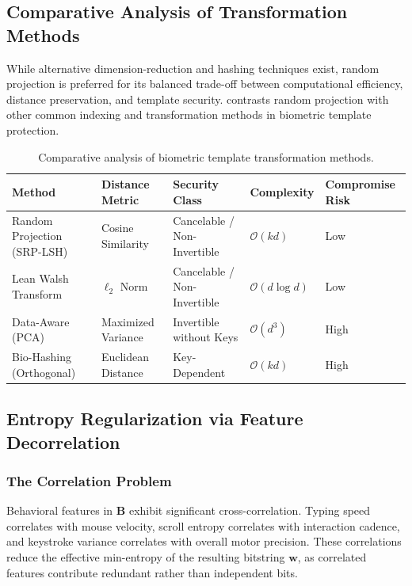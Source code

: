 \documentclass[11pt,twoside]{amsart}
\theoremstyle{plain}
\theoremstyle{definition}
\theoremstyle{remark}
\newcommand{\bB}{\mathbf{B}}
\newcommand{\bw}{\mathbf{w}}
\begin{document}
\subsection{Comparative Analysis of Transformation Methods}

While alternative dimension-reduction and hashing techniques exist, random projection is preferred for its balanced trade-off between computational efficiency, distance preservation, and template security.  contrasts random projection with other common indexing and transformation methods in biometric template protection.

\begin{table}[htbp]
\centering
\caption{Comparative analysis of biometric template transformation methods.}
\label{tab:comparison}
\begin{tabular}{@{}p{3cm}p{2.5cm}p{2.5cm}p{2cm}p{2.5cm}@{}}
\toprule
\textbf{Method} & \textbf{Distance Metric} & \textbf{Security Class} & \textbf{Complexity} & \textbf{Compromise Risk} \\
\midrule
Random Projection (SRP-LSH) & Cosine Similarity & Cancelable / Non-Invertible & $\mathcal{O}(kd)$ & Low \\
Lean Walsh Transform & $\ell_2$ Norm & Cancelable / Non-Invertible & $\mathcal{O}(d \log d)$ & Low \\
Data-Aware (PCA) & Maximized Variance & Invertible without Keys & $\mathcal{O}(d^3)$ & High \\
Bio-Hashing (Orthogonal) & Euclidean Distance & Key-Dependent & $\mathcal{O}(kd)$ & High \\
\bottomrule
\end{tabular}
\end{table}

\subsection{Entropy Regularization via Feature Decorrelation}

\subsubsection{The Correlation Problem}

Behavioral features in $\bB$ exhibit significant cross-correlation. Typing speed correlates with mouse velocity, scroll entropy correlates with interaction cadence, and keystroke variance correlates with overall motor precision. These correlations reduce the effective min-entropy of the resulting bitstring $\bw$, as correlated features contribute redundant rather than independent bits.
\end{document}
